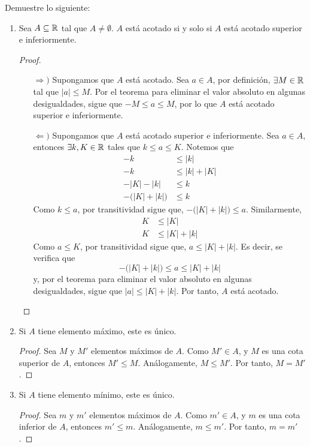 Demuestre lo siguiente:

\begin{enumerate}[label=\alph*)]
  \item Sea $A\subseteq \mathbb{R}$ tal que $A\neq \emptyset$. $A$ está acotado si y solo si $A$ está acotado superior e inferiormente.
 
  \begin{proof} \leavevmode
   \begin{itemize}
    \item[$\Rightarrow)$] Supongamos que $A$ está acotado. Sea $a\in A$, por definición, $\exists M\in \mathbb{R}$ tal que $|a|\leq M$. Por el teorema para eliminar el valor absoluto en algunas desigualdades, sigue que $-M\leq a \leq M$, por lo que $A$ está acotado superior e inferiormente.
    \item[$\Leftarrow)$] Supongamos que $A$ está acotado superior e inferiormente. Sea $a\in A$, entonces $\exists k, K\in \mathbb{R}$ tales que $k\leq a \leq K$. Notemos que
    \begin{align*}
     -k &\leq |k|\\
     -k &\leq |k| + |K|\\
     -|K|-|k| &\leq k\\
     - \big(|K|+|k|\big) &\leq k
    \end{align*}
    Como $k\leq a$, por transitividad sigue que, $-\big(|K|+|k|\big) \leq a$. Similarmente,
    \begin{align*}
     K &\leq |K|\\
     K &\leq |K| + |k|
    \end{align*}
    Como $a\leq K$, por transitividad sigue que, $a\leq |K|+|k|$. Es decir, se verifica que \[-\big(|K|+|k|\big) \leq a \leq |K|+|k|\]
    y, por el teorema para eliminar el valor absoluto en algunas desigualdades, sigue que $|a| \leq |K| + |k|$. Por tanto, $A$ está acotado. \qedhere
   \end{itemize}
  \end{proof}
  
  \item Si $A$ tiene elemento máximo, este es único.
  
  \begin{proof}\leavevmode
    Sea $M$ y $M'$ elementos máximos de $A$. Como $M'\in A$, y $M$ es una cota superior de $A$, entonces $M'\leq M$. Análogamente, $M\leq M'$. Por tanto, $M=M'$.
  \end{proof}
  
  \item Si $A$ tiene elemento mínimo, este es único.
  \begin{proof}\leavevmode
    Sea $m$ y $m'$ elementos máximos de $A$. Como $m'\in A$, y $m$ es una cota inferior de $A$, entonces $m'\leq m$. Análogamente, $m\leq m'$. Por tanto, $m=m'$.
  \end{proof}
  

\end{enumerate}
